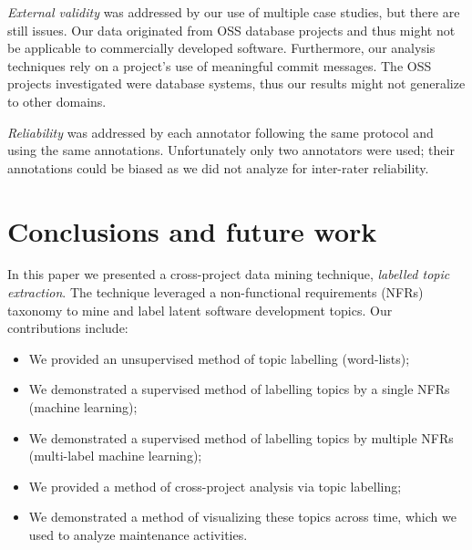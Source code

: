 \documentclass[]{sig-alternate}
\begin{document}
\emph{External validity} was addressed by our use of multiple case studies, but there are still issues. 
Our data originated from OSS database projects and thus might not be applicable to commercially developed software. 
Furthermore, our analysis techniques rely on a project's use of meaningful commit messages. The OSS projects investigated were database systems, thus 
our results might not generalize to other domains.

\emph{Reliability} was addressed by each annotator following the same protocol and using the same annotations. 
Unfortunately only two annotators were used; their annotations could be biased as we did not analyze for inter-rater reliability.


\section{Conclusions and future work}


In this paper we presented a cross-project data mining technique, \emph{labelled topic extraction}. The technique leveraged  a non-functional requirements (NFRs) taxonomy to mine and label latent software development topics. %
Our contributions include:
\begin{itemize}
\item We provided an unsupervised method of topic labelling (word-lists);
\item We demonstrated a supervised method of labelling topics by a single NFRs (machine learning);
\item We demonstrated a supervised method of labelling topics by multiple NFRs (multi-label machine learning);
\item We provided a method of cross-project analysis via topic labelling;
\item We demonstrated a method of visualizing these topics across time, which we used to analyze maintenance activities.
\end{itemize}
\end{document}
